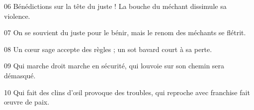 
06 Bénédictions sur la tête du juste ! La bouche du méchant dissimule sa violence.

07 On se souvient du juste pour le bénir, mais le renom des méchants se flétrit.

08 Un cœur sage accepte des règles ; un sot bavard court à sa perte.

09 Qui marche droit marche en sécurité, qui louvoie sur son chemin sera démasqué.

10 Qui fait des clins d’œil provoque des troubles, qui reproche avec franchise fait œuvre de paix.
